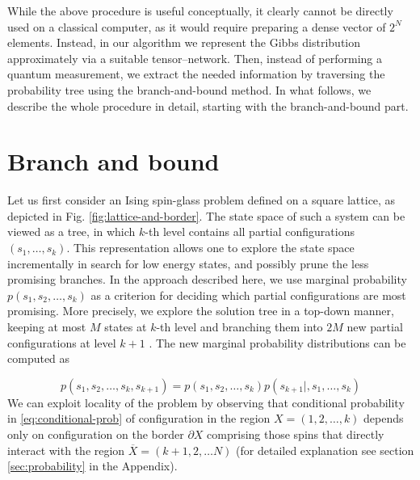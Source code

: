 While the above procedure is useful conceptually, it clearly cannot be directly
used on a classical computer, as it would require preparing a dense vector of
$2^{N}$ elements. Instead, in our algorithm we represent the Gibbs distribution
approximately via a suitable tensor--network. Then, instead of performing a
quantum measurement, we extract the needed information by traversing the
probability tree using the branch-and-bound method. In what follows, we
describe the whole procedure in detail, starting with the branch-and-bound
part.

\section{Branch and bound}
Let us first consider an Ising spin-glass problem defined on a square lattice,
as depicted in Fig. \ref{fig:lattice-and-border}. The state space of such a
system can be viewed as a tree, in which $k$-th level contains all partial
configurations $(s_1, \ldots, s_k)$. This representation allows one to explore
the state space incrementally in search for low energy states, and possibly
prune the less promising branches. In the approach described here, we use
marginal probability $p(s_1, s_2, \ldots, s_k)$ as a criterion for deciding
which partial configurations are most promising. More precisely, we explore the
solution tree in a top-down manner, keeping at most $M$ states at $k$-th level
and branching them into $2M$ new partial configurations at level $k+1$ . The
new marginal probability distributions can be computed as

\begin{equation}
  \label{eq:conditional-prob}
  p(s_1, s_2, \ldots, s_k, s_{k+1}) = p(s_1, s_2, \ldots, s_k)p(s_{k+1}|, s_1, \ldots, s_k)
\end{equation}
We can exploit locality of the problem by observing that conditional
probability in \eqref{eq:conditional-prob} of configuration in the region $X =
  (1, 2, \ldots, k)$ depends only on configuration on the border $\partial X$ comprising those spins that directly interact with the region
$\overline{X} = (k+1, 2, \ldots N)$ (for detailed explanation see section
\ref{sec:probability} in the Appendix).

